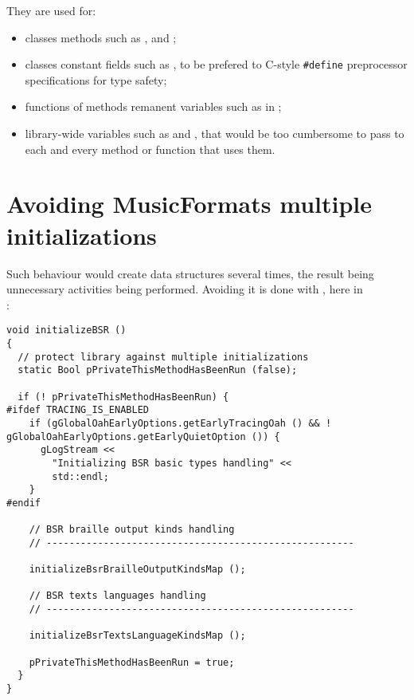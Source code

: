 They are used for:
\begin{itemize}
\item classes methods such as ,  and ;

\item classes constant fields such as , to be prefered to C-style {\tt \#define} preprocessor specifications for type safety;

\item functions of methods remanent variables such as  in ;

\item library-wide variables such as  and , that would be too cumbersome to pass to each and every method or function that uses them.
\end{itemize}


\section{Avoiding MusicFormats multiple initializations}

Such behaviour would create data structures several times, the result being unnecessary activities being performed. Avoiding it is done with , here in \\
:
\begin{lstlisting}[language=CPlusPlus]
void initializeBSR ()
{
  // protect library against multiple initializations
  static Bool pPrivateThisMethodHasBeenRun (false);

  if (! pPrivateThisMethodHasBeenRun) {
#ifdef TRACING_IS_ENABLED
    if (gGlobalOahEarlyOptions.getEarlyTracingOah () && ! gGlobalOahEarlyOptions.getEarlyQuietOption ()) {
      gLogStream <<
        "Initializing BSR basic types handling" <<
        std::endl;
    }
#endif

    // BSR braille output kinds handling
    // ------------------------------------------------------

    initializeBsrBrailleOutputKindsMap ();

    // BSR texts languages handling
    // ------------------------------------------------------

    initializeBsrTextsLanguageKindsMap ();

    pPrivateThisMethodHasBeenRun = true;
  }
}
\end{lstlisting}


